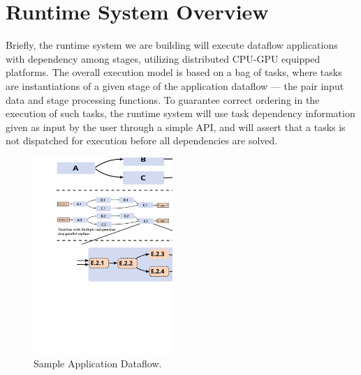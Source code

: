 \section{Runtime System Overview}


Briefly, the runtime system we are building will execute dataflow applications
with dependency among stages, utilizing distributed CPU-GPU equipped platforms.
The overall execution model is based on a bag of tasks, where tasks are
instantiations of a given stage of the application dataflow --- the pair input
data and stage processing functions. To guarantee correct ordering in the
execution of such tasks, the runtime system will use task dependency
information given as input by the user through a simple API, and will assert
that a tasks is not dispatched for execution before all dependencies are
solved. 




\begin{figure}[ht]
\begin{center}
\includegraphics[width=0.47\textwidth]{images/appDataflow}
\caption{Sample Application Dataflow.}
\label{fig:sampleDataflow}
\end{center}
\end{figure}


